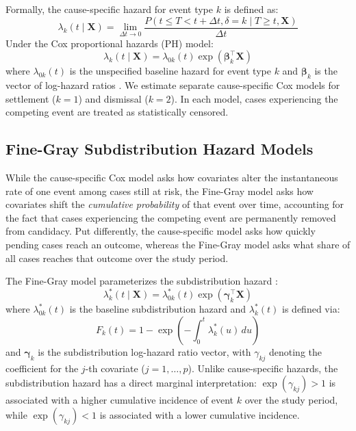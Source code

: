 Formally, the cause-specific hazard for event type $k$ is defined as:
\begin{equation}
\lambda_k(t \mid \mathbf{X}) = \lim_{\Delta t \to 0} \frac{P(t \leq T < t + \Delta t, \delta = k \mid T \geq t, \mathbf{X})}{\Delta t}
\end{equation}
Under the Cox proportional hazards (PH) model:
\begin{equation}
\label{eq:cox_ph}
\lambda_k(t \mid \mathbf{X}) = \lambda_{0k}(t) \exp(\boldsymbol{\beta}_k^\top \mathbf{X})
\end{equation}
where $\lambda_{0k}(t)$ is the unspecified baseline hazard for event type $k$ and $\boldsymbol{\beta}_k$ is the vector of log-hazard ratios \citep{cox1972}. We estimate separate cause-specific Cox models for settlement ($k = 1$) and dismissal ($k = 2$). In each model, cases experiencing the competing event are treated as statistically censored.

\subsection{Fine-Gray Subdistribution Hazard Models}

While the cause-specific Cox model asks how covariates alter the
instantaneous rate of one event among cases still at risk, the
Fine-Gray model asks how covariates shift the \emph{cumulative
probability} of that event over time, accounting for the fact
that cases experiencing the competing event are permanently
removed from candidacy. Put differently, the cause-specific
model asks how quickly pending cases reach an outcome,
whereas the Fine-Gray model asks what share of all cases
reaches that outcome over the study period.

The Fine-Gray model parameterizes the subdistribution hazard \citep{fine1999}:
\begin{equation}
\lambda_k^*(t \mid \mathbf{X}) = \lambda_{0k}^*(t) \exp(\boldsymbol{\gamma}_k^\top \mathbf{X})
\end{equation}
where $\lambda_{0k}^*(t)$ is the baseline subdistribution hazard and $\lambda_k^*(t)$ is defined via:
\begin{equation}
F_k(t) = 1 - \exp\left(-\int_0^t \lambda_k^*(u) \, du\right)
\end{equation}
and $\boldsymbol{\gamma}_k$ is the subdistribution log-hazard ratio vector, with $\gamma_{kj}$ denoting the coefficient for the $j$-th covariate ($j = 1, \ldots, p$). Unlike cause-specific hazards, the subdistribution hazard has a direct marginal interpretation: $\exp(\gamma_{kj}) > 1$ is associated with a higher cumulative incidence of event $k$ over the study period, while $\exp(\gamma_{kj}) < 1$ is associated with a lower cumulative incidence.

